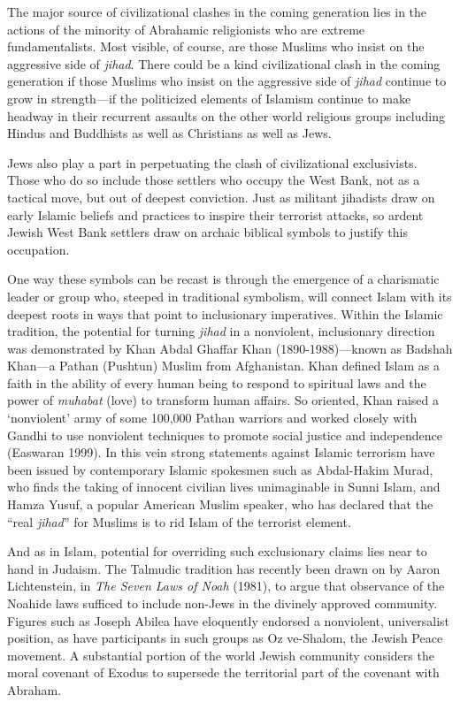 The major source of civilizational clashes in the coming generation lies in the actions of the minority of Abrahamic religionists who are extreme fundamentalists. Most visible, of course, are those Muslims who insist on the aggressive side of \emph{jihad}. There could be a kind civilizational clash in the coming generation if those Muslims who insist on the aggressive side of \emph{jihad} continue to grow in strength---if the politicized elements of Islamism continue to make headway in their recurrent assaults on the other world religious groups including Hindus and Buddhists as well as Christians as well as Jews. 

Jews also play a part in perpetuating the clash of civilizational exclusivists. Those who do so include those settlers who occupy the West Bank, not as a tactical move, but out of deepest conviction. Just as militant jihadists draw on early Islamic beliefs and practices to inspire their terrorist attacks, so ardent Jewish West Bank settlers draw on archaic biblical symbols to justify this occupation.

One way these symbols can be recast is through the emergence of a charismatic leader or group who, steeped in traditional symbolism, will connect Islam with its deepest roots in ways that point to inclusionary imperatives. Within the Islamic tradition, the potential for turning \emph{jihad} in a nonviolent, inclusionary direction was demonstrated by Khan Abdal Ghaffar Khan (1890-1988)---known as Badshah Khan---a Pathan (Pushtun) Muslim from Afghanistan. Khan defined Islam as a faith in the ability of every human being to respond to spiritual laws and the power of \emph{muhabat} (love) to transform human affairs. So oriented, Khan raised a `nonviolent' army of some 100,000 Pathan warriors and worked closely with Gandhi to use nonviolent techniques to promote social justice and independence (Easwaran 1999). In this vein strong statements against Islamic terrorism have been issued by contemporary Islamic spokesmen such as Abdal-Hakim Murad, who finds the taking of innocent civilian lives unimaginable in Sunni Islam, and Hamza Yusuf, a popular American Muslim speaker, who has declared that the ``real \emph{jihad}'' for Muslims is to rid Islam of the terrorist element.

And as in Islam, potential for overriding such exclusionary claims lies near to hand in Judaism. The Talmudic tradition has recently been drawn on by Aaron Lichtenstein, in \emph{The Seven Laws of Noah} (1981), to argue that observance of the Noahide laws sufficed to include non-Jews in the divinely approved community. Figures such as Joseph Abilea have eloquently endorsed a nonviolent, universalist position, as have participants in such groups as Oz ve-Shalom, the Jewish Peace movement. A substantial portion of the world Jewish community considers the moral covenant of Exodus to supersede the territorial part of the covenant with Abraham.

